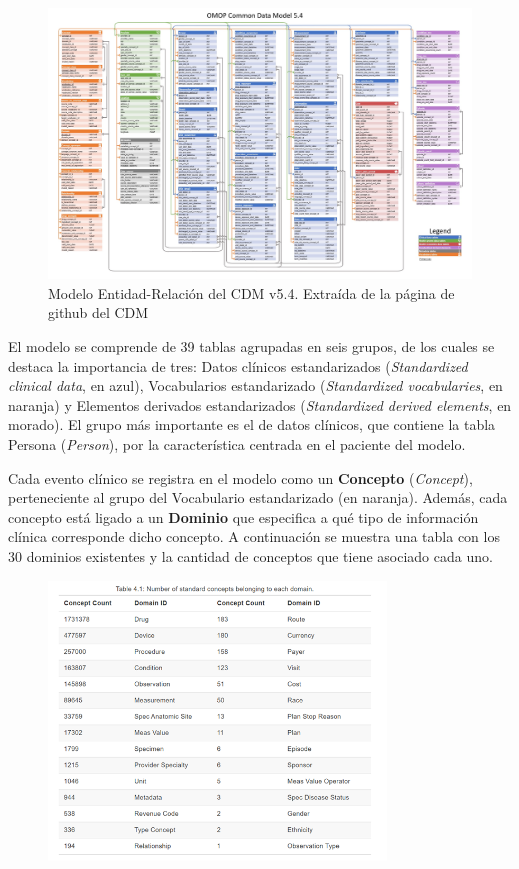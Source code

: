 \begin{figure}[H]
    \centering
    \includegraphics[width=1\textwidth]{figures/cdm_ER.jpg}
     \caption{Modelo Entidad-Relación del CDM v5.4. Extraída de la página de github del CDM \cite{gitPagesCMD}}
    \label{fig:cdm_ER}
\end{figure}

El modelo se comprende de 39 tablas agrupadas en seis grupos, de los cuales se destaca la importancia de tres: Datos clínicos estandarizados (\textit{Standardized clinical data}, en azul), Vocabularios estandarizado (\textit{Standardized vocabularies}, en naranja) y Elementos derivados estandarizados (\textit{Standardized derived elements}, en morado). El grupo más importante es el de datos clínicos, que contiene la tabla Persona (\textit{Person}), por la característica centrada en el paciente del modelo.

Cada evento clínico se registra en el modelo como un \textbf{Concepto} (\textit{Concept}), perteneciente al grupo del Vocabulario estandarizado (en naranja). Además, cada concepto está ligado a un \textbf{Dominio} que especifica a qué tipo de información clínica corresponde dicho concepto. A continuación se muestra una tabla con los 30 dominios existentes y la cantidad de conceptos que tiene asociado cada uno.

\begin{figure}[H]
    \centering
    \includegraphics[width=0.80\textwidth]{figures/cdm_domains.png}
    \label{fig:cdm_domains}
\end{figure}

